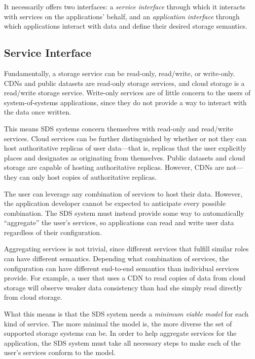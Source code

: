 It necessarily offers two interfaces:  a \emph{service interface} through which it interacts with
services on the applications' behalf, and an \emph{application interface} through
which applications interact with data and define their desired storage
semantics.

\subsection{Service Interface}

Fundamentally, a storage service can be read-only, read/write, or write-only.
CDNs and public datasets are read-only storage services, and cloud storage is a
read/write storage service.  Write-only services are of little concern to the
users of system-of-systems applications, since they do not provide a way to
interact with the data once written.

This means SDS systems concern themselves with read-only and read/write
services.  Cloud services can be further distinguished by whether
or not they can host authoritative replicas of user data---that is, replicas
that the user explicitly places and designates as originating from themselves.
Public datasets and cloud storage are capable of hosting authoritative
replicas.  However, CDNs are not---they can only host copies of authoritative
replicas.

The user can leverage any combination of services to host their data.  However,
the application developer cannot be expected to anticipate every possible
combination.  The SDS system must instead provide some way to automatically
``aggregate'' the user's services, so applications can read and
write user data regardless of their configuration.

Aggregating services is not trivial, since different services that fulfill
similar roles can have different semantics.  Depending what combination of
services, the configuration can have different end-to-end semantics than
individual services provide.  For example, a user that uses a CDN to read
copies of data from cloud storage will observe weaker data consistency than
had she simply read directly from cloud storage.

What this means is that the SDS system needs a \emph{minimum viable model} for each
kind of service.  The more minimal the model is, the more diverse the set of
supported storage systems can be.  In order to help aggregate services for the
application, the SDS system must take all necessary steps to make each of the
user's services conform to the model.

